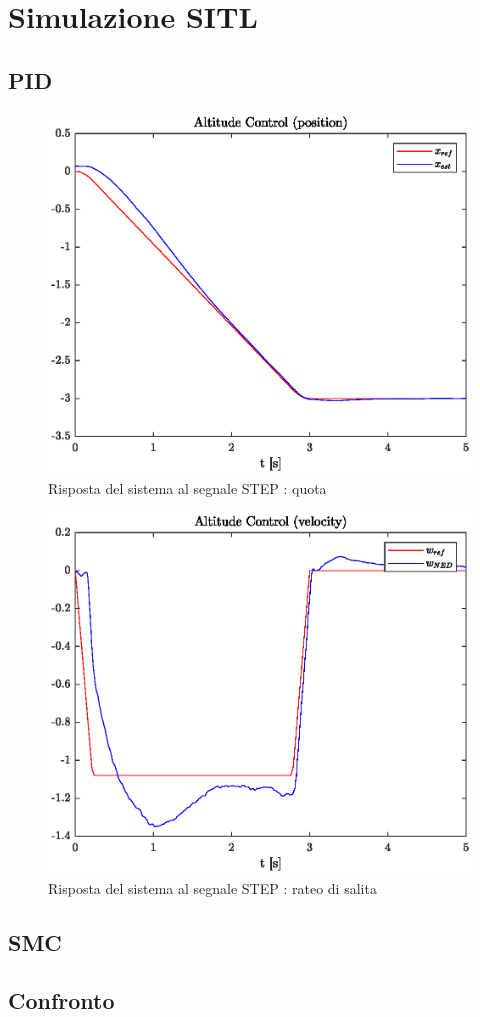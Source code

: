 \section{Simulazione SITL}
\subsection{PID}

\begin{figure}
	\centering
	\includegraphics[width=1\textwidth]{Simulazioni/Figure/STEPaltitudecontrolpos}
	\caption{Risposta del sistema al segnale STEP : quota}
\end{figure}

\begin{figure}
	\centering
	\includegraphics[width=1\textwidth]{Simulazioni/Figure/STEPaltitudecontrolvel}
	\caption{Risposta del sistema al segnale STEP : rateo di salita}
\end{figure}

\subsection{SMC}



\subsection{Confronto}
